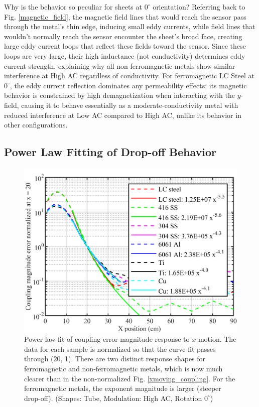 \documentclass[journal,twoside,web]{ieeecolor}
\begin{document}
Why is the behavior so peculiar for sheets at $0^\circ$ orientation? Referring back to Fig. \ref{magnetic_field}, the magnetic field lines that would reach the sensor pass through the metal's thin edge, inducing small eddy currents, while field lines that wouldn't normally reach the sensor encounter the sheet's broad face, creating large eddy current loops that reflect these fields toward the sensor. Since these loops are very large, their high inductance (not conductivity) determines eddy current strength, explaining why all non-ferromagnetic metals show similar interference at High AC regardless of conductivity. For ferromagnetic LC Steel at $0^\circ$, the eddy current reflection dominates any permeability effects; its magnetic behavior is constrained by high demagnetization when interacting with the $y$-field, causing it to behave essentially as a moderate-conductivity metal with reduced interference at Low AC compared to High AC, unlike its behavior in other configurations.

\subsection{Power Law Fitting of Drop-off Behavior} \label{sec:Power Law}

\begin{figure}[tb]
\centerline{\includegraphics[width=\columnwidth]{chaic16.png}}
\caption{Power law fit of coupling error magnitude response to $x$ motion. The data for each sample is normalized so that the curve fit passes through (20, 1). There are two distinct response shapes for ferromagnetic and non-ferromagnetic metals, which is now much clearer than in the non-normalized Fig. \ref{xmoving_coupling}. For the ferromagnetic metals, the exponent magnitude is larger (steeper drop-off). 
(Shapes: Tube, Modulation: High AC, Rotation $0^\circ$)}
\label{coupling_fit}
\end{figure}
\end{document}
